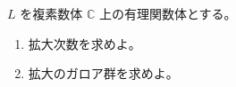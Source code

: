 \documentclass[12pt]{jlreq}
\newcommand{\C}{\mathbb{C}}
\begin{document}

\(L\) を複素数体 \(\C\) 上の有理関数体とする。

\begin{enumerate}
  \item 拡大次数を求めよ。
  \item 拡大のガロア群を求めよ。
\end{enumerate}
\end{document}
